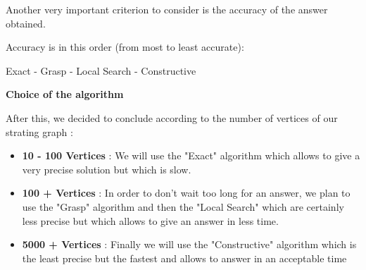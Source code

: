 Another very important criterion to consider is the accuracy of the answer obtained. \bigskip 

Accuracy is in this order (from most to least accurate):

Exact - Grasp - Local Search - Constructive \bigskip 

\large\textbf{Choice of the algorithm} \newline

After this, we decided to conclude according to the number of vertices of our strating graph :

\begin{itemize}
    \item \textbf{10 - 100 Vertices} : We will use the "Exact" algorithm which allows to give a very precise solution but which is slow.

    \item \textbf{100 + Vertices} : In order to don't wait too long for an answer, we plan to use the "Grasp" algorithm and then the "Local Search" which are certainly less precise but which allows to give an answer in less time.

    \item \textbf{5000 + Vertices} : Finally we will use the "Constructive" algorithm which is the least precise but the fastest and allows to answer in an acceptable time

\end{itemize}
